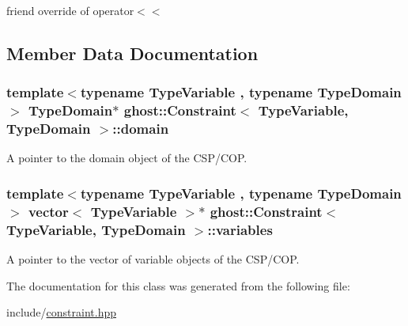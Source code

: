 friend override of operator$<$$<$ 



\subsection{Member Data Documentation}
\hypertarget{classghost_1_1Constraint_a0ea15d113ab23ddb6ad74be72f7ac90d}{
\subsubsection[{domain}]{\setlength{\rightskip}{0pt plus 5cm}template$<$typename Type\-Variable , typename Type\-Domain $>$ Type\-Domain$\ast$ {\bf ghost\-::\-Constraint}$<$ Type\-Variable, Type\-Domain $>$\-::domain\hspace{0.3cm}{\ttfamily [protected]}}}\label{classghost_1_1Constraint_a0ea15d113ab23ddb6ad74be72f7ac90d}


A pointer to the domain object of the C\-S\-P/\-C\-O\-P. 

\hypertarget{classghost_1_1Constraint_a827e487bd77c8dbc4701d1dfae39678a}{
\subsubsection[{variables}]{\setlength{\rightskip}{0pt plus 5cm}template$<$typename Type\-Variable , typename Type\-Domain $>$ vector$<$ Type\-Variable $>$$\ast$ {\bf ghost\-::\-Constraint}$<$ Type\-Variable, Type\-Domain $>$\-::variables\hspace{0.3cm}{\ttfamily [protected]}}}\label{classghost_1_1Constraint_a827e487bd77c8dbc4701d1dfae39678a}


A pointer to the vector of variable objects of the C\-S\-P/\-C\-O\-P. 



The documentation for this class was generated from the following file\-:\begin{DoxyCompactItemize}
\item 
include/\hyperlink{constraint_8hpp}{constraint.\-hpp}\end{DoxyCompactItemize}
